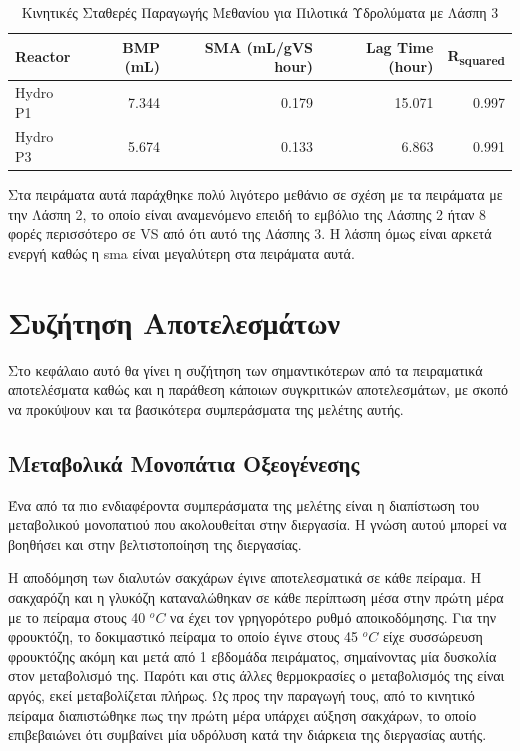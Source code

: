 \documentclass[11pt]{report}
\begin{document}
\begin{enumerate}
\begin{table}[htbp]
\caption{\label{tab:orga4b7599}Κινητικές Σταθερές Παραγωγής Μεθανίου για Πιλοτικά Υδρολύματα με Λάσπη 3}
\centering
\begin{tabular}{lrrrr}
Reactor & BMP (mL) & SMA (mL/gVS hour) & Lag Time (hour) & R\textsubscript{squared}\\[0pt]
\hline
Hydro P1 & 7.344 & 0.179 & 15.071 & 0.997\\[0pt]
Hydro P3 & 5.674 & 0.133 & 6.863 & 0.991\\[0pt]
\end{tabular}
\end{table}

Στα πειράματα αυτά παράχθηκε πολύ λιγότερο μεθάνιο σε σχέση με τα πειράματα με την Λάσπη 2, το οποίο είναι αναμενόμενο επειδή το εμβόλιο της Λάσπης 2 ήταν 8 φορές περισσότερο σε VS από ότι αυτό της Λάσπης 3. Η λάσπη όμως είναι αρκετά ενεργή καθώς η \acrshort{sma} είναι μεγαλύτερη στα πειράματα αυτά.
\end{enumerate}

\chapter{Συζήτηση Αποτελεσμάτων}
\label{sec:org05b3443}
\label{sec:result_discussion}

Στο κεφάλαιο αυτό θα γίνει η συζήτηση των σημαντικότερων από τα πειραματικά αποτελέσματα καθώς και η παράθεση κάποιων συγκριτικών αποτελεσμάτων, με σκοπό να προκύψουν και τα βασικότερα συμπεράσματα της μελέτης αυτής.

\section{Μεταβολικά Μονοπάτια Οξεογένεσης}
\label{sec:org59ede2f}
Ένα από τα πιο ενδιαφέροντα συμπεράσματα της μελέτης είναι η διαπίστωση του μεταβολικού μονοπατιού που ακολουθείται στην διεργασία. Η γνώση αυτού μπορεί να βοηθήσει και στην βελτιστοποίηση της διεργασίας.

Η αποδόμηση των διαλυτών σακχάρων έγινε αποτελεσματικά σε κάθε πείραμα. Η σακχαρόζη και η γλυκόζη καταναλώθηκαν σε κάθε περίπτωση μέσα στην πρώτη μέρα με το πείραμα στους 40 \(^oC\) να έχει τον γρηγορότερο ρυθμό αποικοδόμησης. Για την φρουκτόζη, το δοκιμαστικό πείραμα το οποίο έγινε στους 45 \(^oC\) είχε συσσώρευση φρουκτόζης ακόμη και μετά από 1 εβδομάδα πειράματος, σημαίνοντας μία δυσκολία στον μεταβολισμό της. Παρότι και στις άλλες θερμοκρασίες ο μεταβολισμός της είναι αργός, εκεί μεταβολίζεται πλήρως. Ως προς την παραγωγή τους, από το κινητικό πείραμα διαπιστώθηκε πως την πρώτη μέρα υπάρχει αύξηση σακχάρων, το οποίο επιβεβαιώνει ότι συμβαίνει μία υδρόλυση κατά την διάρκεια της διεργασίας αυτής.
\end{document}
